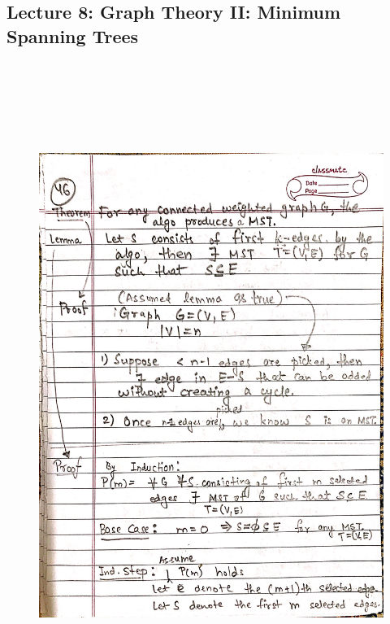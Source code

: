 \newpage
{\color{black} \subsection*{Lecture 8: Graph Theory II: Minimum Spanning Trees}}
\begin{figure}[H]
    \centering
    \includegraphics[width=16cm, height=21cm]{"./MIT-6.042J/MIT-6042J-046"}
\end{figure}

